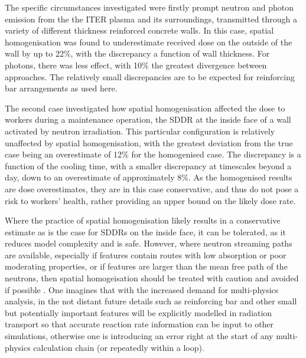The specific circumstances investigated were firstly prompt neutron and photon emission from the the ITER plasma and its surroundings, transmitted through a variety of different thickness reinforced concrete walls. In this case, spatial homogenisation was found to underestimate received dose on the outside of the wall by up to 22\%, with the discrepancy a function of wall thickness. For photons, there was less effect, with 10\% the greatest divergence between approaches. The relatively small discrepancies are to be expected for reinforcing bar arrangements as used here. 

The second case investigated how spatial homogenisation affected the dose to workers during a maintenance operation, the SDDR at the inside face of a wall activated by neutron irradiation. This particular configuration is relatively unaffected by spatial homogenisation, with the greatest deviation from the true case being an overestimate of 12\% for the homogenised case. The discrepancy is a function of the cooling time, with a smaller discrepancy at timescales beyond a day, down to an overestimate of approximately 8\%. As the homogenised results are dose overestimates, they are in this case conservative, and thus do not pose a risk to workers' health, rather providing an upper bound on the likely dose rate. 

Where the practice of spatial homogenisation likely results in a conservative estimate as is the case for SDDRs on the inside face, it can be tolerated, as it reduces model complexity and is safe. However, where neutron streaming paths are available, especially if features contain routes with low absorption or poor moderating properties, or if features are larger than the mean free path of the neutrons, then spatial homogeisation should be treated with caution and avoided if possible \cite{Pampin2007}. One imagines that with the increased demand for multi-physics analysis, in the not distant future details such as reinforcing bar and other small but potentially important features will be explicitly modelled in radiation transport so that accurate reaction rate information can be input to other simulations, otherwise one is introducing an error right at the start of any multi-physics calculation chain (or repeatedly within a loop).


